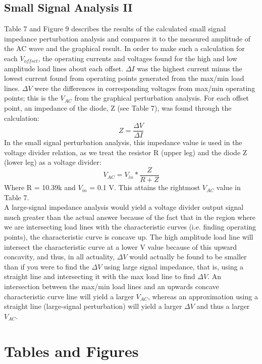 \documentclass{article}
\begin{document}
\subsection{Small Signal Analysis II}
    Table 7 and Figure 9 describes the results of the calculated small signal impedance perturbation analysis and compares it to the measured amplitude of the AC wave and the graphical result. In order to make such a calculation for each $V_{offset}$, the operating currents and voltages found for the high and low amplitude load lines about each offset. $\Delta I$ was the highest current minus the lowest current found from operating points generated from the max/min load lines. $\Delta V$ were the differences in corresponding voltages from max/min operating points; this is the $V_{AC}$ from the graphical perturbation analysis. For each offset point, an impedance of the diode, Z (see Table 7), was found through the calculation:
    \begin{equation}
        Z = \frac{\Delta V}{\Delta I}
    \end{equation}
    In the small signal perturbation analysis, this impedance value is used in the voltage divider relation, as we treat the resistor R (upper leg) and the diode Z (lower leg) as a voltage divider:
    \begin{equation}
        V_{AC} = V_{in} * \frac{Z}{R + Z}
    \end{equation}
    Where R = 10.39k and $V_{in}$ = 0.1 V. This attains the rightmost $V_{AC}$ value in Table 7. \\\indent A large-signal impedance analysis would yield a voltage divider output signal much greater than the actual answer because of the fact that in the region where we are intersecting load lines with the characteristic curves (i.e. finding operating points), the characteristic curve is concave up. The high amplitude load line will intersect the characteristic curve at a lower V value because of this upward concavity, and thus, in all actuality, $\Delta V$ would actually be found to be smaller than if you were to find the $\Delta V$ using large signal impedance, that is, using a straight line and intersecting it with the max load line to find $\Delta V$. An intersection between the max/min load lines and an upwards concave characteristic curve line will yield a larger $V_{AC}$, whereas an approximation using a straight line (large-signal perturbation) will yield a larger $\Delta V$ and thus a larger $V_{AC}$.



\section{Tables and Figures}
\end{document}
